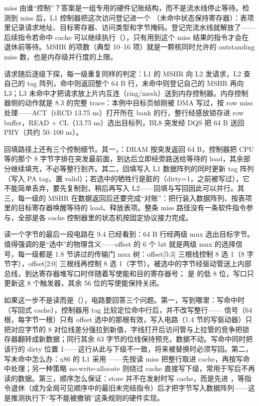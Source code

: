 
miss 由谁“控制”？答案是一组专用的硬件记账结构，而不是流水线停止等待。检测到 miss 后，L1 控制器把这次访问登记进一个 （未命中状态保持寄存器）：表项里记录请求地址、目标寄存器、访问类型和字节掩码。登记完流水线就解放了——后续指令若命中 cache 可以继续执行（），只有用到这个 miss 结果的指令才会在退休前等待。MSHR 的项数（典型 10--16 项）就是一颗核同时允许的 outstanding miss 数，也是内存级并行度的上限。

请求随后逐级下探，每一级重复同样的判定：L1 的 MSHR 向 L2 发请求，L2 查自己的 tag 阵列，命中则返回整个 64 B 行，未命中则登记自己的 MSHR 再向 L3；L3 未命中才把请求放上片内互连（ring/mesh）送到内存控制器。内存控制器侧的动作就是 8.3 的完整 trace：本例中目标页帧刚被 DMA 写过，按 row miss 处理——ACT（tRCD 13.75 ns）打开所在 bank 的行，整行经感放锁存进 row buffer，READ + CL（13.75 ns）选出目标列，BL8 突发经 DQS 把 64 B 送回 PHY（共约 50--100 ns）。

回填路径上还有三个控制细节。其一，：DRAM 按突发返回 64 B，控制器把 CPU 等的那个 8 字节字排在突发最前面，到达后立即经旁路送给等待的 load，其余部分继续填充，不必等整行到齐。其二，回填写入 L1 数据阵列的同时更新 tag 阵列（写入 PA tag、置 valid）；若选中的牺牲行是脏的（dirty=1，之前被写过），它不能简单丢弃，要先复制到，稍后再写入 L2——回填与写回因此可以并行。其三，每一级的 MSHR 在数据返回后还要完成“对账”：把行装入数据阵列、按表项里的目标寄存器唤醒等待的 load、释放表项。整条 miss 路径没有一条软件指令参与，全部是各 cache 控制器里的状态机按固定协议接力完成。


读一个字节的最后一段电路在 9.4 已经看到：64 B 行经两级 mux 选出目标字节。值得强调的是“选中”的物理含义——offset 的 6 个 bit 就是两级 mux 的选择信号，每一级都是 1.8 节讲过的传输门 mux 树：offset[5:3] 三根线控制 8 选 1（8 字节字），offset[2:0] 三根线再控制 8 选 1（字节）。被选中的字节经驱动管送上内部总线，到达寄存器堆写口时伴随着写使能和目的寄存器号； 是  的低 8 位，写口只更新这 8 个触发器，其余 56 位的写使能保持关闭。

如果这一步不是读而是（），电路要回答三个问题。第一，写到哪里：写命中时（写回式 cache），控制器用 tag 比较定位命中行后，并不改写整行—— 信号（64 根，每字节一根）只有 offset 选中的那根有效，写入电路（1.4 节的写驱动器）只把对应字节的 8 对位线差分强拉到新值，字线打开后访问管与上拉管的竞争把锁存器翻转成新数据；同行其余 63 字节的位线保持预充，数据不动。写命中同时把该行的 dirty 位置 1——这行从此与下级不一致，将来被替换时必须写回。第二，写未命中怎么办：x86 的 L1 采用 ——先按读 miss 把整行取进 cache，再按写命中处理；另一种策略 no-write-allocate 则绕过 cache 直接写下级，常用于写后不再读的数据。第三，顺序怎么保证：store 并不在发射时写 cache，而是先进 ，等指令退休（成为全局可见顺序中的最旧未完结指令）后才把字节写入数据阵列——这是推测执行下“写不能被撤销”这条规则的硬件实现。

